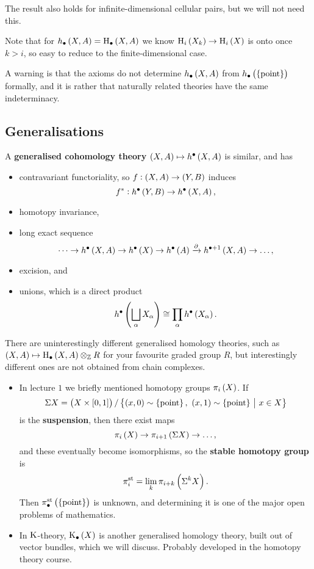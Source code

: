 The result also holds for infinite-dimensional cellular pairs, but we will not need this.

\begin{example*}
Note that for $ h_\bullet\br{X, A} = \H_\bullet\br{X, A} $ we know $ \H_i\br{X_k} \to \H_i\br{X} $ is onto once $ k > i $, so easy to reduce to the finite-dimensional case.
\end{example*}

A warning is that the axioms do not determine $ h_\bullet\br{X, A} $ from $ h_\bullet\br{\pt} $ formally, and it is rather that naturally related theories have the same indeterminacy.

\subsection{Generalisations}

\begin{remark*}
A \textbf{generalised cohomology theory} $ \br{X, A} \mapsto h^\bullet\br{X, A} $ is similar, and has
\begin{itemize}
\item contravariant functoriality, so $ f : \br{X, A} \to \br{Y, B} $ induces
$$ f^* : h^\bullet\br{Y, B} \to h^\bullet\br{X, A}, $$
\item homotopy invariance,
\item long exact sequence
$$ \dots \to h^\bullet\br{X, A} \to h^\bullet\br{X} \to h^\bullet\br{A} \xrightarrow{\da} h^{\bullet + 1}\br{X, A} \to \dots, $$
\item excision, and
\item unions, which is a direct product
$$ h^\bullet\br{\bigsqcup_\alpha X_\alpha} \cong \prod_\alpha h^\bullet\br{X_\alpha}. $$
\end{itemize}
\end{remark*}

\pagebreak

\begin{remark*}
There are uninterestingly different generalised homology theories, such as $ \br{X, A} \mapsto \H_\bullet\br{X, A} \otimes_\ZZ R $ for your favourite graded group $ R $, but interestingly different ones are not obtained from chain complexes.
\begin{itemize}
\item In lecture $ 1 $ we briefly mentioned homotopy groups $ \pi_i\br{X} $. If
$$ \Sigma X = \br{X \times \sbr{0, 1}} / \cbr{\br{x, 0} \sim \pt, \ \br{x, 1} \sim \pt \st x \in X} $$
is the \textbf{suspension}, then there exist maps
$$ \pi_i\br{X} \to \pi_{i + 1}\br{\Sigma X} \to \dots, $$
and these eventually become isomorphisms, so the \textbf{stable homotopy group} is
$$ \pi_i^{\s\t} = \lim_k \pi_{i + k}\br{\Sigma^kX}. $$
Then $ \pi_\bullet^{\s\t}\br{\pt} $ is unknown, and determining it is one of the major open problems of mathematics.
\item In $ \mathrm{K} $-theory, $ \K_\bullet\br{X} $ is another generalised homology theory, built out of vector bundles, which we will discuss. Probably developed in the homotopy theory course.
\end{itemize}
\end{remark*}

